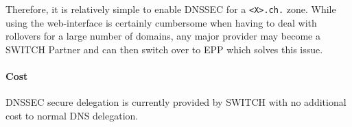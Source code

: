 \documentclass[a4paper,twocolumn]{scrartcl}
\begin{document}
Therefore, it is relatively simple to enable DNSSEC for a \verb|<X>.ch.| 
zone. While using the web-interface is certainly cumbersome when
having to deal with rollovers for a large number of domains, any major
provider may become a SWITCH Partner and can then switch over to EPP
which solves this issue.

\paragraph{Cost} DNSSEC secure delegation is currently provided by
SWITCH with no additional cost to normal DNS delegation.

\nocite{*}


\end{document}
